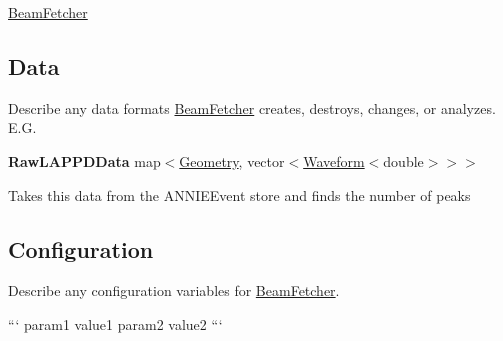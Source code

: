 \hyperlink{classBeamFetcher}{Beam\-Fetcher}

\subsection*{Data}

Describe any data formats \hyperlink{classBeamFetcher}{Beam\-Fetcher} creates, destroys, changes, or analyzes. E.\-G.

{\bfseries Raw\-L\-A\-P\-P\-D\-Data} {\ttfamily map$<$\hyperlink{classGeometry}{Geometry}, vector$<$\hyperlink{classWaveform}{Waveform}$<$double$>$$>$$>$}
\begin{DoxyItemize}
\item Takes this data from the {\ttfamily A\-N\-N\-I\-E\-Event} store and finds the number of peaks
\end{DoxyItemize}

\subsection*{Configuration}

Describe any configuration variables for \hyperlink{classBeamFetcher}{Beam\-Fetcher}.

``` param1 value1 param2 value2 ``` 